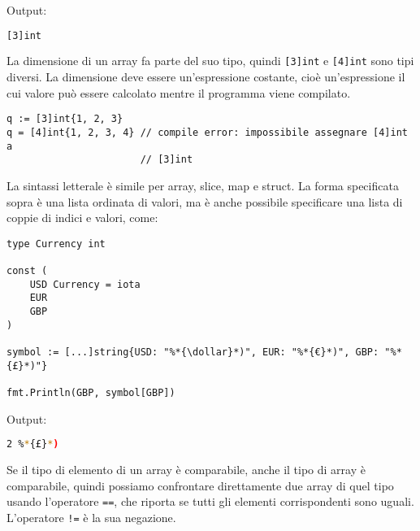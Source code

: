 \documentclass[../../thesis.tex]{subfiles}
\begin{document}
    Output:
    \begin{lstlisting}[language = bash, frame = L,label={lst:lstlisting3-1.5}]
[3]int
    \end{lstlisting}
    La dimensione di un array fa parte del suo tipo, quindi \verb|[3]int| e \verb|[4]int| sono tipi diversi.
    La dimensione deve essere un'espressione costante, cioè un'espressione il cui valore può essere calcolato mentre il programma viene compilato.
    \begin{lstlisting}[frame = single,label={lst:lstlisting3-1.6}]
q := [3]int{1, 2, 3}
q = [4]int{1, 2, 3, 4} // compile error: impossibile assegnare [4]int a
                       // [3]int
    \end{lstlisting}
    La sintassi letterale è simile per array, slice, map e struct.
    La forma specificata sopra è una lista ordinata di valori, ma è anche possibile specificare una lista di coppie di indici e valori, come:
    \begin{lstlisting}[frame = single,label={lst:lstlisting3-1.7}]
type Currency int

const (
    USD Currency = iota
    EUR
    GBP
)

symbol := [...]string{USD: "%*{\dollar}*)", EUR: "%*{€}*)", GBP: "%*{£}*)"}

fmt.Println(GBP, symbol[GBP])
    \end{lstlisting}
    Output:
    \begin{lstlisting}[language = bash, frame = L,label={lst:lstlisting3-1.8}]
2 %*{£}*)
    \end{lstlisting}
    Se il tipo di elemento di un array è comparabile, anche il tipo di array è comparabile, quindi possiamo confrontare direttamente due array di quel tipo usando l'operatore \verb"==", che riporta se tutti gli elementi corrispondenti sono uguali.
    L'operatore \verb"!=" è la sua negazione.
    \hfill \vspace{12pt}
\end{document}
